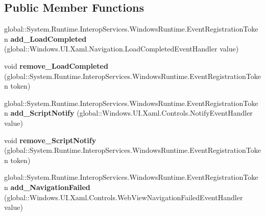 \subsection*{Public Member Functions}
\begin{DoxyCompactItemize}
\item 
\mbox{\label{class_windows_1_1_u_i_1_1_xaml_1_1_controls_1_1_web_view_a0563dd4525e20d9e5e5e3820e06dabcd}} 
global\+::\+System.\+Runtime.\+Interop\+Services.\+Windows\+Runtime.\+Event\+Registration\+Token {\bfseries add\+\_\+\+Load\+Completed} (global\+::\+Windows.\+U\+I.\+Xaml.\+Navigation.\+Load\+Completed\+Event\+Handler value)
\item 
\mbox{\label{class_windows_1_1_u_i_1_1_xaml_1_1_controls_1_1_web_view_acdebbf50fcaf701e5341abb5ca3fa7c8}} 
void {\bfseries remove\+\_\+\+Load\+Completed} (global\+::\+System.\+Runtime.\+Interop\+Services.\+Windows\+Runtime.\+Event\+Registration\+Token token)
\item 
\mbox{\label{class_windows_1_1_u_i_1_1_xaml_1_1_controls_1_1_web_view_a54bccbc6d255165ad4baa671cc7c26ca}} 
global\+::\+System.\+Runtime.\+Interop\+Services.\+Windows\+Runtime.\+Event\+Registration\+Token {\bfseries add\+\_\+\+Script\+Notify} (global\+::\+Windows.\+U\+I.\+Xaml.\+Controls.\+Notify\+Event\+Handler value)
\item 
\mbox{\label{class_windows_1_1_u_i_1_1_xaml_1_1_controls_1_1_web_view_ac99974ef564800b4ce687df69c6ad394}} 
void {\bfseries remove\+\_\+\+Script\+Notify} (global\+::\+System.\+Runtime.\+Interop\+Services.\+Windows\+Runtime.\+Event\+Registration\+Token token)
\item 
\mbox{\label{class_windows_1_1_u_i_1_1_xaml_1_1_controls_1_1_web_view_a821897d8daf66a762e290ec2f26a618d}} 
global\+::\+System.\+Runtime.\+Interop\+Services.\+Windows\+Runtime.\+Event\+Registration\+Token {\bfseries add\+\_\+\+Navigation\+Failed} (global\+::\+Windows.\+U\+I.\+Xaml.\+Controls.\+Web\+View\+Navigation\+Failed\+Event\+Handler value)
\item 
\mbox{\label{class_windows_1_1_u_i_1_1_xaml_1_1_controls_1_1_web_view_ae13455a3000672cc979f6f33f5928195}} 

\end{DoxyCompactItemize}
